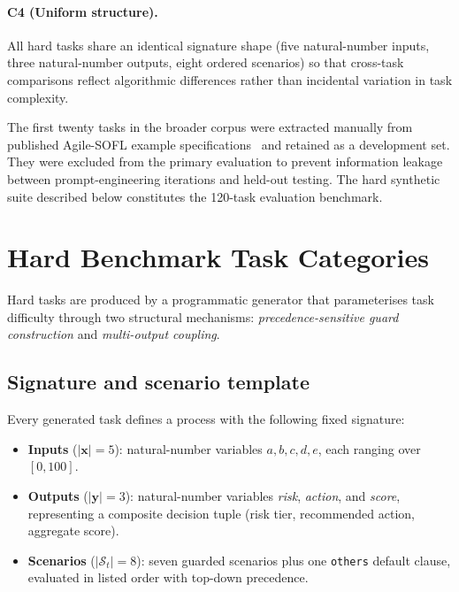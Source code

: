 \paragraph{C4 (Uniform structure).}
All hard tasks share an identical signature shape (five natural-number
inputs, three natural-number outputs, eight ordered scenarios) so that
cross-task comparisons reflect algorithmic differences rather than
incidental variation in task complexity.

The first twenty tasks in the broader corpus were extracted manually from
published Agile-SOFL example specifications~\citep{liu2004soflbook} and retained as a development set.
They were excluded from the primary evaluation to prevent information leakage
between prompt-engineering iterations and held-out testing.  The hard synthetic
suite described below constitutes the 120-task evaluation benchmark.

\section{Hard Benchmark Task Categories}
\label{sec:bench:categories}

Hard tasks are produced by a programmatic generator that parameterises task
difficulty through two structural mechanisms: \emph{precedence-sensitive
guard construction} and \emph{multi-output coupling}.

\subsection{Signature and scenario template}

Every generated task defines a process with the following fixed signature:

\begin{itemize}
  \item \textbf{Inputs} ($|\mathbf{x}| = 5$): natural-number variables
        $a, b, c, d, e$, each ranging over $[0, 100]$.
  \item \textbf{Outputs} ($|\mathbf{y}| = 3$): natural-number variables
        \textit{risk}, \textit{action}, and \textit{score}, representing a
        composite decision tuple (risk tier, recommended action, aggregate
        score).
  \item \textbf{Scenarios} ($|\mathcal{S}_t| = 8$): seven guarded scenarios
        plus one \texttt{others} default clause, evaluated in listed order
        with top-down precedence.
\end{itemize}


